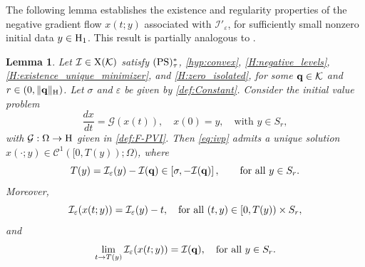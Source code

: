 \documentclass{article}
\newcommand{\boK}{\mathcal{K}}
\newcommand{\boI}{\mathcal{I}}
\newcommand{\boG}{\mathcal{G}}
\newcommand{\Hilb}{{\textnormal H}}
\newcommand{\minq}{{\bf q}}
\newcommand{\X}{{\textnormal X}}
\newcommand{\PS}{(\textnormal{PS})^{*}_\tau}
\newcommand{\taumax}{T}
\newtheorem{lemma}{Lemma}[section]
\theoremstyle{definition}
\begin{document}
The following lemma establishes the existence and regularity properties of the negative gradient flow $x(t;y)$ associated with $\boI'_\varepsilon$, for sufficiently small nonzero initial data $y\in\Hilb_1$. This result is partially analogous to \cite[Lemma 4]{Bre-Nir}. 

\begin{lemma}\label{lemma:PVI}
Let $\boI\in\X(\boK)$  satisfy $\PS$, \eqref{hyp:convex}, \eqref{H:negative_levels}, \eqref{H:existence_unique_minimizer}, and  \eqref{H:zero_isolated}, for some $\minq\in\boK$ and $r\in(0,\|\minq\|_\Hilb)$. Let $\sigma$ and $\varepsilon$ be given by \eqref{def:Constant}. Consider the initial value problem
\begin{equation}\label{eq:ivp}
	\frac{dx}{dt}=\boG(x(t)),\quad x(0)=y,\quad\text{with }y\in S_r,
\end{equation}
with ${\boG}:\Omega\to\Hilb$ given in \eqref{def:F-PVI}. Then \eqref{eq:ivp} admits a unique  solution $x(\cdot;y) \in \mathcal{C}^1([0,\taumax(y)); \Omega)$, where
\begin{equation}\label{eq:taumax-bounds}
\taumax(y)=\boI_\varepsilon(y)-\boI(\minq)\in\left[\sigma,-\boI(\minq)\right],\qquad\hbox{for all }y\in S_r.
\end{equation}
Moreover,
\begin{equation}\label{ineq:regularized-flow}
\boI_\varepsilon(x(t;y))=\boI_\varepsilon(y)-t,\quad \hbox{for all } (t,y)\in[0,\taumax(y))\times S_r,
\end{equation}
and
\begin{equation}
\lim_{t\to\taumax(y)}\boI_\varepsilon(x(t;y))=\boI(\minq),\quad\hbox{for all }y\in S_r.
\end{equation}
\end{lemma}
\end{document}
